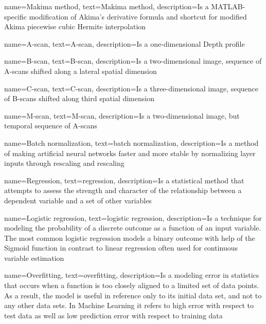 {
        name=Makima method,
        text=Makima method,
        description={Is a MATLAB-specific modification of Akima's derivative formula and shortcut for modified Akima piecewise cubic Hermite interpolation}
}

{
        name=A-scan,
        text=A-scan,
        description={Is a one-dimensional Depth profile}
}


{
        name=B-scan,
        text=B-scan,
        description={Is a two-dimensional image, sequence of A-scans shifted along a lateral spatial dimension}
}

{
        name=C-scan,
        text=C-scan,
        description={Is a three-dimensional image, sequence of B-scans shifted along third spatial dimension}
}

{
        name=M-scan,
        text=M-scan,
        description={Is a two-dimensional image, but temporal sequence of A-scans}
}

{
        name=Batch normalization,
        text=batch normalization,
        description={Is a method of making artificial neural networks faster and more stable by normalizing layer inputs through rescaling and rescaling}
}

{
        name=Regression,
        text=regression,
        description={Is a statistical method that attempts to assess the strength and character of the relationship between a dependent variable and a set of other variables \cite{Beers.2021}}
}

{
        name=Logistic regression,
        text=logistic regression,
        description={Is a technique for modeling the probability of a discrete outcome as a function of an input variable. The most common logistic regression models a binary outcome with help of the Sigmoid function in contrast to linear regression often used for continuous variable estimation \cite{Edgar.2017}}
}

{
        name=Overfitting,
        text=overfitting,
        description={Is a modeling error in statistics that occurs when a function is too closely aligned to a limited set of data points. As a result, the model is useful in reference only to its initial data set, and not to any other data sets. \cite{Twin.2021} In Machine Learning it refers to high error with respect to test data as well as low prediction error with respect to training data}
}

